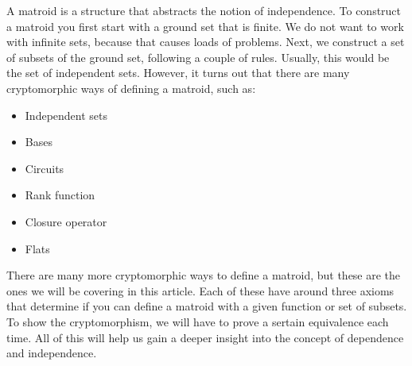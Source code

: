 A matroid is a structure that abstracts the notion of independence. To construct a matroid you first start with a ground set that is finite. We do not want to work with infinite sets, because that causes loads of problems. Next, we construct a set of subsets of the ground set, following a couple of rules. Usually, this would be the set of independent sets. However, it turns out that there are many cryptomorphic ways of defining a matroid, such as:
\begin{itemize}
    \item Independent sets
    \item Bases
    \item Circuits
    \item Rank function
    \item Closure operator
    \item Flats
\end{itemize}
There are many more cryptomorphic ways to define a matroid, but these are the ones we will be covering in this article. Each of these have around three axioms that determine if you can define a matroid with a given function or set of subsets. To show the cryptomorphism, we will have to prove a sertain equivalence each time. All of this will help us gain a deeper insight into the concept of dependence and independence.